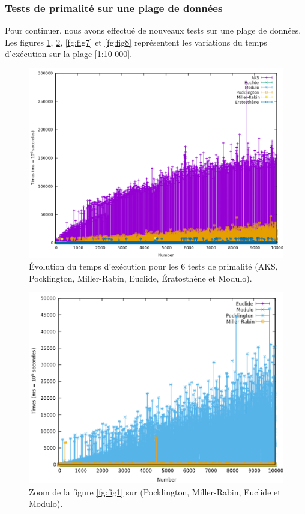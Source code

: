 	\subsubsection{Tests de primalité sur une plage de données}
Pour continuer, nous avons effectué de nouveaux tests sur une plage de données. Les figures \ref{fg:fig5}, \ref{fg:fig6}, \ref{fg:fig7} et \ref{fg:fig8} représentent les variations du temps d'exécution sur la plage [1:10 000].
\begin{figure}[!ht]
		\begin{center}\includegraphics[scale=0.5]{RANGE.png}\end{center}
		\caption{Évolution du temps d'exécution pour les 6 tests de primalité (AKS, Pocklington, Miller-Rabin, Euclide, Ératosthène et Modulo). }
		\label{fg:fig5}
\end{figure}
\begin{figure}[!ht]
		\begin{center}\includegraphics[scale=0.5]{RZoom1.png}\end{center}
		\caption{Zoom de la figure \ref{fg:fig1} sur (Pocklington, Miller-Rabin, Euclide et Modulo).}
		\label{fg:fig6}
\end{figure}
